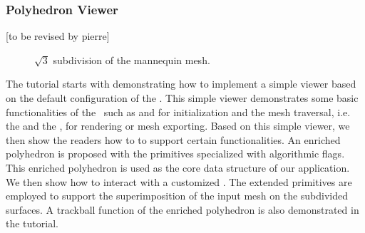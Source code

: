 \documentclass[twocolumn]{article}
\begin{document}
\subsubsection*{Polyhedron Viewer}
[to be revised by pierre]


\begin{figure}[t]
    \caption{$\sqrt{3}$ subdivision of the mannequin mesh.}
    \label{fig:sqrt3}
\end{figure}


The tutorial starts with demonstrating how to implement a simple
viewer based on the default configuration of the \cgalpoly . This
simple viewer demonstrates some basic functionalities of the
\cgalpoly\ such as  and  
for initialization and the mesh traversal, i.e. the 
and the , for rendering or mesh exporting. Based
on this simple viewer, we then show the readers how to
 to support certain functionalities. 
An enriched polyhedron is proposed with the primitives specialized
with algorithmic flags. This enriched polyhedron is used as the core
data structure of our application.  We then show how to interact with
a customized \poly.  The extended primitives are employed to support
the superimposition of the input mesh on the subdivided surfaces. A
trackball function of the enriched polyhedron is also demonstrated in
the tutorial.
\end{document}
